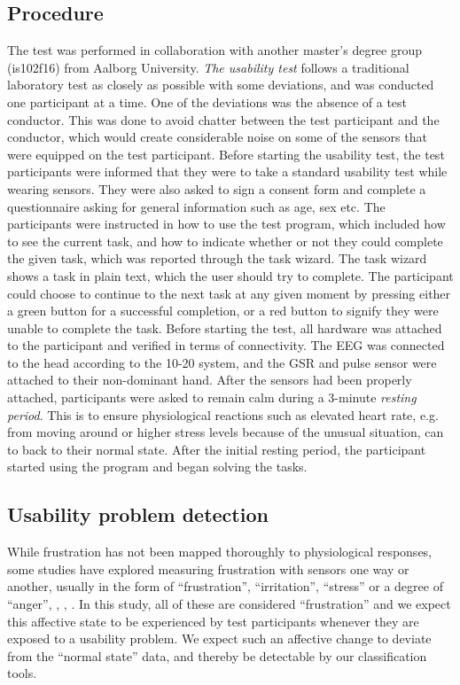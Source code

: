 \subsection{Procedure}
The test was performed in collaboration with another master's degree group (is102f16) from Aalborg University.
\textit{The usability test} follows a traditional laboratory test as closely as possible with some deviations, and was conducted one participant at a time. 
One of the deviations was the absence of a test conductor. This was done to avoid chatter between the test participant and the conductor, which would create considerable noise on some of the sensors that were equipped on the test participant.
Before starting the usability test, the test participants were informed that they were to take a standard usability test while wearing sensors.
They were also asked to sign a consent form and complete a questionnaire asking for general information such as age, sex etc.  
The participants were instructed in how to use the test program, which included how to see the current task, and how to indicate whether or not they could complete the given task, which was reported through the task wizard. 
The task wizard shows a task in plain text, which the user should try to complete. The participant could choose to continue to the next task at any given moment by pressing either a green button for a successful completion, or a red button to signify they were unable to complete the task. 
Before starting the test, all hardware was attached to the participant and verified in terms of connectivity. 
The EEG was connected to the head according to the 10-20 system\cite{eeg_tech_10_20}, and the GSR and pulse sensor were attached to their non-dominant hand.
After the sensors had been properly attached, participants were asked to remain calm during a 3-minute \textit{resting period}. 
This is to ensure physiological reactions such as elevated heart rate, e.g. from moving around or higher stress levels because of the unusual situation, can to back to their normal state. 
After the initial resting period, the participant started using the program and began solving the tasks. 

\subsection{Usability problem detection}
While frustration has not been mapped thoroughly to physiological responses, some studies have explored measuring
frustration with sensors one way or another, usually in the form of ``frustration'', ``irritation'', ``stress'' or a
degree of ``anger''\cite{affective_pacman}, \cite{brainwave_signals_frustration}, \cite{web20_frustration}, \cite{bipolar_frustration}.
In this study, all of these are considered ``frustration'' and we expect this affective state to be
experienced by test participants whenever they are exposed to a usability problem. We expect such an affective change
to deviate from the ``normal state'' data, and thereby be detectable by our classification tools.

